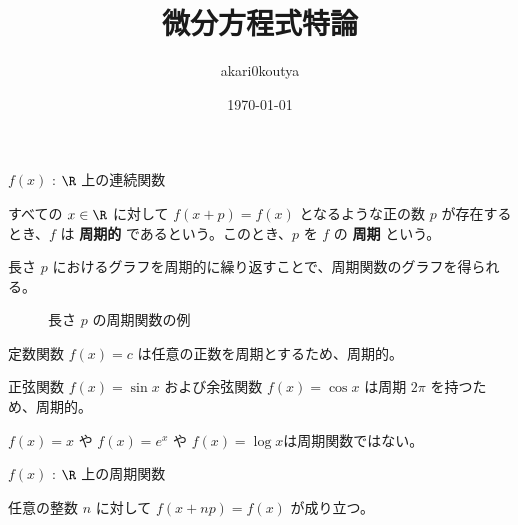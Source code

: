 \documentclass[article,paper=a4paper]{jlreq}
\title{微分方程式特論}
\author{akari0koutya}
\date{\today}
\begin{document}
\maketitle
\tableofcontents

\begin{dfn}
\quad $f(x)$ : $\R$ 上の連続関数\par
すべての $x \in \R$ に対して $f(x+p) = f(x)$ となるような正の数 $p$ が存在するとき、$f$ は \textbf{周期的} であるという。このとき、$p$ を $f$ の \textbf{周期} という。
\end{dfn}

長さ $p$ におけるグラフを周期的に繰り返すことで、周期関数のグラフを得られる。

\begin{figure}[htbp]
\centering
{}\caption{長さ $p$ の周期関数の例}
\end{figure}

\begin{ex}
定数関数 $f(x) = c$ は任意の正数を周期とするため、周期的。
\end{ex}

\begin{ex}
    正弦関数 $f(x) = \sin x$ および余弦関数 $f(x) = \cos x$ は周期 $2\pi$ を持つため、周期的。
\end{ex}

\begin{ex}[周期関数でない関数の例]
    $f(x) = x$ や $f(x) = e^x$ や $f(x) = \log x$は周期関数ではない。
\end{ex}

\begin{prop}
    \quad $f(x)$ : $\R$ 上の周期関数\par
    任意の整数 $n$ に対して $f(x+np) = f(x)$ が成り立つ。
\end{prop}
\end{document}
